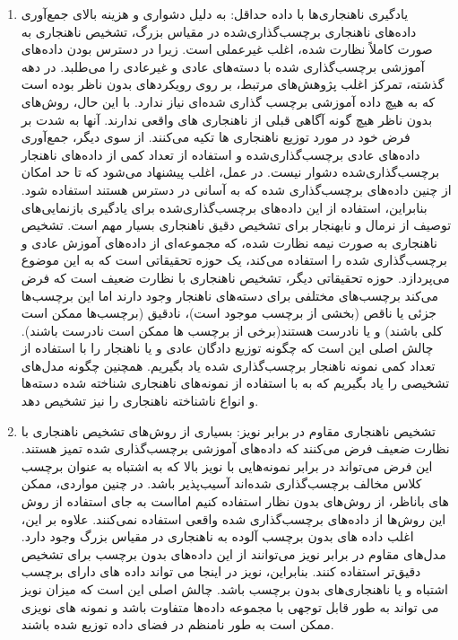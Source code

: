 \documentclass[12pt,a4paper]{report}
\begin{document}
\begin{enumerate}
\item {
	یادگیری ناهنجاری‌ها با داده حداقل:
به دلیل دشواری و هزینه بالای جمع‌آوری داده‌های ناهنجاری برچسب‌گذاری‌شده در مقیاس بزرگ، تشخیص ناهنجاری به صورت کاملاً نظارت شده، اغلب غیرعملی است. زیرا در دسترس بودن داده‌های آموزشی برچسب‌گذاری شده با دسته‌های عادی و غیرعادی را می‌طلبد. در دهه گذشته، تمرکز اغلب پژوهش‌های مرتبط، بر روی رویکردهای بدون ناظر بوده است که به هیچ داده آموزشی برچسب گذاری شده‌ای نیاز ندارد. با این حال، روش‌های بدون ناظر هیچ گونه آگاهی قبلی از ناهنجاری های واقعی ندارند. آنها به شدت بر فرض خود در مورد توزیع ناهنجاری ها تکیه می‌کنند. از سوی دیگر، جمع‌آوری داده‌های عادی برچسب‌گذاری‌شده و استفاده از تعداد کمی از داده‌های ناهنجار برچسب‌گذاری‌شده دشوار نیست. در عمل، اغلب پیشنهاد می‌شود که تا حد امکان از چنین داده‌های برچسب‌گذاری شده که به آسانی در دسترس هستند استفاده شود\cite{OutlierAnalysis2017}. بنابراین، استفاده از این داده‌های برچسب‌گذاری‌شده برای یادگیری بازنمایی‌های توصیف از نرمال و نابهنجار برای تشخیص دقیق ناهنجاری بسیار مهم است. تشخیص ناهنجاری به صورت نیمه نظارت شده، که مجموعه‌ای از داده‌های آموزش عادی و برچسب‌گذاری شده را استفاده می‌کند، یک حوزه تحقیقاتی است که به این موضوع می‌پردازد. حوزه تحقیقاتی دیگر، تشخیص ناهنجاری با نظارت ضعیف است که فرض می‌کند برچسب‌های مختلفی برای دسته‌های ناهنجار وجود دارند اما این برچسب‌ها جزئی یا ناقص (بخشی از برچسب موجود است)، نادقیق (برچسب‌ها ممکن است کلی باشند) و یا نادرست هستند(برخی از برچسب ها ممکن است نادرست باشند). چالش اصلی این است که چگونه توزیع دادگان عادی و یا ناهنجار را با استفاده از تعداد کمی نمونه ناهنجار برچسب‌گذاری‌ شده یاد بگیریم. همچنین چگونه مدل‌های تشخیصی را یاد بگیریم که به با استفاده از نمونه‌های ناهنجاری شناخته شده دسته‌ها و انواع ناشناخته ناهنجاری را نیز تشخیص دهد.

}

\item{
تشخیص ناهنجاری مقاوم در برابر نویز:
بسیاری از روش‌های تشخیص ناهنجاری با نظارت ضعیف فرض می‌کنند که داده‌های آموزشی برچسب‌گذاری شده تمیز هستند. این فرض می‌تواند در برابر نمونه‌هایی با نویز بالا که به اشتباه به عنوان برچسب کلاس مخالف برچسب‌گذاری شده‌اند آسیب‌پذیر باشد. در چنین مواردی، ممکن است به جای استفاده از روش‌‎های باناظر، از روش‌های بدون نظار استفاده کنیم اما این روش‌ها از داده‌های برچسب‌گذاری شده واقعی استفاده نمی‌کنند. علاوه بر این، اغلب داده های بدون برچسب آلوده به ناهنجاری در مقیاس بزرگ وجود دارد. مدل‌های مقاوم در برابر نویز می‌توانند از این داده‌های بدون برچسب برای تشخیص دقیق‌تر استفاده کنند. بنابراین، نویز در اینجا می تواند داده های دارای برچسب اشتباه و یا ناهنجاری‌های بدون برچسب باشد. چالش اصلی این است که میزان نویز می تواند به طور قابل توجهی با مجموعه داده‌ها متفاوت باشد و نمونه های نویزی ممکن است به طور نامنظم در فضای داده توزیع شده باشند.

}
\end{enumerate}
\end{document}
